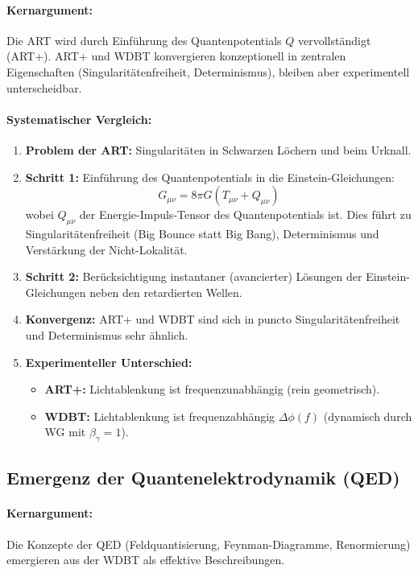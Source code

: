 \documentclass[11pt, a4paper]{article}
\begin{document}
\paragraph{Kernargument:} Die ART wird durch Einführung des Quantenpotentials $Q$ vervollständigt (ART+). ART+ und WDBT konvergieren konzeptionell in zentralen Eigenschaften (Singularitätenfreiheit, Determinismus), bleiben aber experimentell unterscheidbar.

\paragraph{Systematischer Vergleich:}
\begin{enumerate}
    \item \textbf{Problem der ART:} Singularitäten in Schwarzen Löchern und beim Urknall.
    \item \textbf{Schritt 1:} Einführung des Quantenpotentials in die Einstein-Gleichungen:
    \begin{equation}
    \label{eq:einstein_mod}
    G_{\mu\nu} = 8\pi G (T_{\mu\nu} + Q_{\mu\nu})
    \end{equation}
    wobei $Q_{\mu\nu}$ der Energie-Impuls-Tensor des Quantenpotentials ist. Dies führt zu Singularitätenfreiheit (Big Bounce statt Big Bang), Determinismus und Verstärkung der Nicht-Lokalität.
    \item \textbf{Schritt 2:} Berücksichtigung instantaner (avancierter) Lösungen der Einstein-Gleichungen neben den retardierten Wellen.
    \item \textbf{Konvergenz:} ART+ und WDBT sind sich in puncto Singularitätenfreiheit und Determinismus sehr ähnlich.
    \item \textbf{Experimenteller Unterschied:}
    \begin{itemize}
        \item \textbf{ART+:} Lichtablenkung ist frequenzunabhängig (rein geometrisch).
        \item \textbf{WDBT:} Lichtablenkung ist frequenzabhängig $\Delta\phi(f)$ (dynamisch durch WG mit $\beta_\gamma=1$).
    \end{itemize}
\end{enumerate}

\subsection{Emergenz der Quantenelektrodynamik (QED)}
\label{subsec:emergenz_qed}

\paragraph{Kernargument:} Die Konzepte der QED (Feldquantisierung, Feynman-Diagramme, Renormierung) emergieren aus der WDBT als effektive Beschreibungen.
\end{document}
